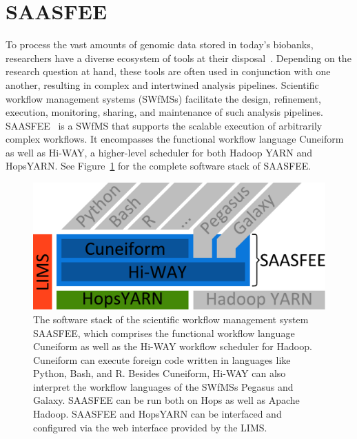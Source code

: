 \section{SAASFEE}
\label{saasfee}


To process the vast amounts of genomic data stored in today's biobanks, researchers have a diverse ecosystem of tools at their disposal~\cite{Pabinger2014}. Depending on the research question at hand, these tools are often used in conjunction with one another, resulting in complex and intertwined analysis pipelines. Scientific workflow management systems (SWfMSs) facilitate the design, refinement, execution, monitoring, sharing, and maintenance of such analysis pipelines. SAASFEE~\cite{vldb_demo} is a SWfMS that supports the scalable execution of arbitrarily complex workflows. It encompasses the functional workflow language Cuneiform as well as Hi-WAY, a higher-level scheduler for both Hadoop YARN and HopsYARN. See Figure~\ref{fig:saasfee_stack} for the complete software stack of SAASFEE.

\begin{figure}
  \centering
  \includegraphics[width=.67\textwidth]{imgs/saasfee_stack.pdf}
  \caption{The software stack of the scientific workflow management system SAASFEE, which comprises the functional workflow language Cuneiform as well as the Hi-WAY workflow scheduler for Hadoop. Cuneiform can execute foreign code written in languages like Python, Bash, and R. Besides Cuneiform, Hi-WAY can also interpret the workflow languages of the SWfMSs Pegasus and Galaxy. SAASFEE can be run both on Hops as well as Apache Hadoop. SAASFEE and HopsYARN can be interfaced and configured via the web interface provided by the LIMS.}
  \label{fig:saasfee_stack}
\end{figure}

